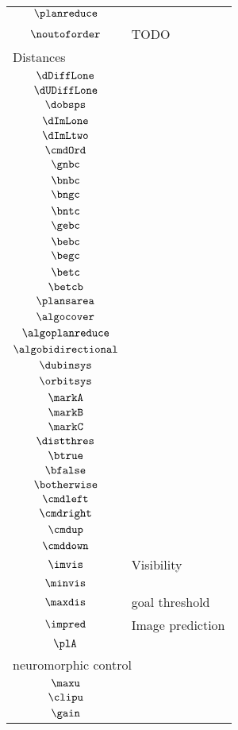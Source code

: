 \begin{longtable}{cl}
 $\planreduce$ & \\ 
 $\noutoforder$ &  TODO\\ 
 \multicolumn{2}{l}{Distances}\\ 
 \hline
$\dDiffLone$ & \\ 
 $\dUDiffLone$ & \\ 
 $\dobsps$ & \\ 
 $\dImLone$ & \\ 
 $\dImLtwo$ & \\ 
 $\cmdOrd$ & \\ 
 $\gnbc$ & \\ 
 $\bnbc$ & \\ 
 $\bngc$ & \\ 
 $\bntc$ & \\ 
 $\gebc$ & \\ 
 $\bebc$ & \\ 
 $\begc$ & \\ 
 $\betc$ & \\ 
 $\betcb$ & \\ 
 $\plansarea$ & \\ 
 $\algocover$ & \\ 
 $\algoplanreduce$ & \\ 
 $\algobidirectional$ & \\ 
 $\dubinsys$ & \\ 
 $\orbitsys$ & \\ 
 $\markA$ & \\ 
 $\markB$ & \\ 
 $\markC$ & \\ 
 $\distthres$ & \\ 
 $\btrue$ & \\ 
 $\bfalse$ & \\ 
 $\botherwise$ & \\ 
 $\cmdleft$ & \\ 
 $\cmdright$ & \\ 
 $\cmdup$ & \\ 
 $\cmddown$ & \\ 
 $\imvis$ &  Visibility\\ 
 $\minvis$ & \\ 
 $\maxdis$ &  goal threshold\\ 
 $\impred$ &  Image prediction\\ 
 $\plA$ & \\ 
 \multicolumn{2}{l}{neuromorphic control}\\ 
 \hline
$\maxu$ & \\ 
 $\clipu$ & \\ 
 $\gain$ & \\ 

\end{longtable}
